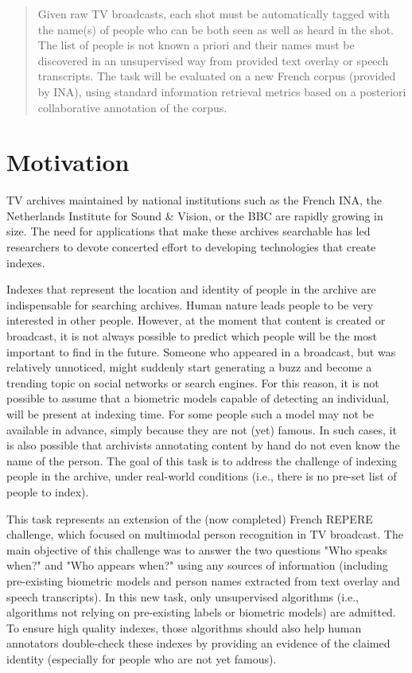 \documentclass{acm_proc_article-me}
\begin{document}
\maketitle
\begin{abstract}
Given raw TV broadcasts, each shot must be automatically tagged with the name(s) of people who can be both seen as well as heard in the shot. The list of people is not known a priori and their names must be discovered in an unsupervised way from provided text overlay or speech transcripts. The task will be evaluated on a new French corpus (provided by INA), using standard information retrieval metrics based on a posteriori collaborative annotation of the corpus.
\end{abstract}

\section{Motivation}

TV archives maintained by national institutions such as the French INA, the Netherlands Institute for Sound \& Vision, or the BBC are rapidly growing in size. The need for applications that make these archives searchable has led researchers to devote concerted effort to developing technologies that create indexes.

Indexes that represent the location and identity of people in the archive are indispensable for searching archives. Human nature leads people to be very interested in other people. However, at the moment that content is created or broadcast, it is not always possible to predict which people will be the most important to find in the future. Someone who appeared in a broadcast, but was relatively unnoticed, might suddenly start generating a buzz and become a trending topic on social networks or search engines. For this reason, it is not possible to assume that a biometric models capable of detecting an individual, will be present at indexing time. For some people such a model may not be available in advance, simply because they are not (yet) famous. In such cases, it is also possible that archivists annotating content by hand do not even know the name of the person. The goal of this task is to address the challenge of indexing people in the archive, under real-world conditions (i.e., there is no pre-set list of people to index). 

This task represents an extension of the (now completed) French REPERE challenge, which focused on multimodal person recognition in TV broadcast. The main objective of this challenge was to answer the two questions "Who speaks when?" and "Who appears when?" using any sources of information (including pre-existing biometric models and person names extracted from text overlay and speech transcripts). In this new task, only unsupervised algorithms (i.e., algorithms not relying on pre-existing labels or biometric models) are admitted. To ensure high quality indexes, those algorithms should also help human annotators double-check these indexes by providing an evidence of the claimed identity (especially for people who are not yet famous).
\end{document}
